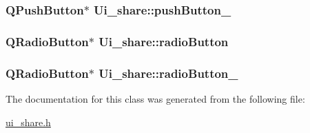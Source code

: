 \hypertarget{classUi__share_aaf953bec7a13c73caccdc827d9dd168b}{
\subsubsection[{push\-Button\-\_\-2}]{\setlength{\rightskip}{0pt plus 5cm}Q\-Push\-Button$\ast$ Ui\-\_\-share\-::push\-Button\-\_}}\label{classUi__share_aaf953bec7a13c73caccdc827d9dd168b}
\hypertarget{classUi__share_aeed2476988d49d33cf654c1f44d55a25}{
\subsubsection[{radio\-Button}]{\setlength{\rightskip}{0pt plus 5cm}Q\-Radio\-Button$\ast$ Ui\-\_\-share\-::radio\-Button}}\label{classUi__share_aeed2476988d49d33cf654c1f44d55a25}
\hypertarget{classUi__share_a8fe0bb6558878d6ed72a76cc287a241d}{
\subsubsection[{radio\-Button\-\_\-2}]{\setlength{\rightskip}{0pt plus 5cm}Q\-Radio\-Button$\ast$ Ui\-\_\-share\-::radio\-Button\-\_}}\label{classUi__share_a8fe0bb6558878d6ed72a76cc287a241d}


The documentation for this class was generated from the following file\-:\begin{DoxyCompactItemize}
\item 
\hyperlink{ui__share_8h}{ui\-\_\-share.\-h}\end{DoxyCompactItemize}
